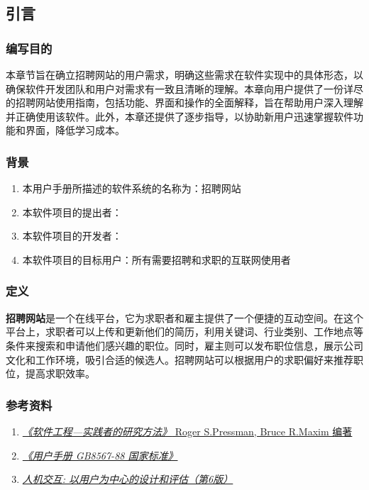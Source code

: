 \documentclass[UTF8,a4paper,10pt]{ctexart}
\begin{document}
\subsection{引言}

\subsubsection{编写目的}

本章节旨在确立招聘网站的用户需求，明确这些需求在软件实现中的具体形态，以确保软件开发团队和用户对需求有一致且清晰的理解。本章向用户提供了一份详尽的招聘网站使用指南，包括功能、界面和操作的全面解释，旨在帮助用户深入理解并正确使用该软件。此外，本章还提供了逐步指导，以协助新用户迅速掌握软件功能和界面，降低学习成本。


\subsubsection{背景}
\begin{enumerate}
    \item 本用户手册所描述的软件系统的名称为：招聘网站 
    \item 本软件项目的提出者：  
    \item 本软件项目的开发者：  
    \item 本软件项目的目标用户：所有需要招聘和求职的互联网使用者 
\end{enumerate}

\subsubsection{定义}
\textbf{招聘网站}是一个在线平台，它为求职者和雇主提供了一个便捷的互动空间。在这个平台上，求职者可以上传和更新他们的简历，利用关键词、行业类别、工作地点等条件来搜索和申请他们感兴趣的职位。同时，雇主则可以发布职位信息，展示公司文化和工作环境，吸引合适的候选人。招聘网站可以根据用户的求职偏好来推荐职位，提高求职效率。

\subsubsection{参考资料}
\begin{enumerate}
    \item  \href{http://images.china-pub.com/ebook40001-45000/41206/ch01.pdf}{\textit{《软件工程—实践者的研究方法》} Roger S.Pressman, Bruce R.Maxim 编著}
    \item \href{https://www.antpedia.com/standard/74250-1.html}{\textit{《用户手册 GB8567-88 国家标准》}}
    \item \href{http://www.tup.tsinghua.edu.cn/booksCenter/book_08468901.html}{\textit{人机交互: 以用户为中心的设计和评估（第6版）}}
\end{enumerate}
\end{document}
